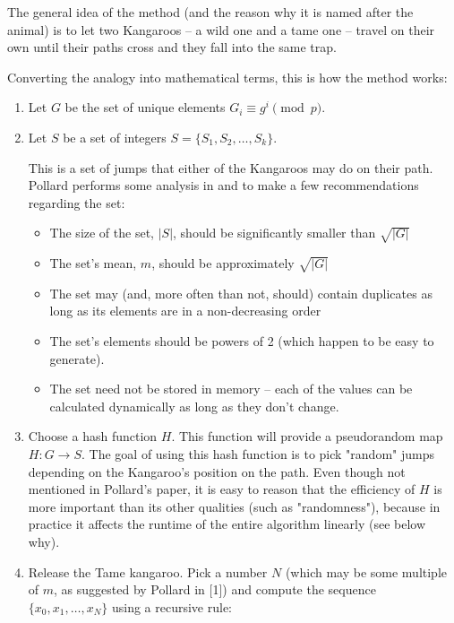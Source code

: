 \documentclass{article}
\begin{document}
        The general idea of the method (and the reason why it is named after the animal) is to let two Kangaroos -- a wild one and a tame one -- travel on their own until their paths cross and they fall into the same trap.

        Converting the analogy into mathematical terms, this is how the method works:

        \begin{enumerate}
          \item Let $G$ be the set of unique elements $G_i \equiv g^i \pmod{p}$.

          \item Let $S$ be a set of integers $S = \{S_1, S_2, \ldots, S_k\}$.

            This is a set of jumps that either of the Kangaroos may do on their path. Pollard performs some analysis in \autocite{Pollard1978} and \autocite{Pollard2000} to make a few recommendations regarding the set:

            \begin{itemize}
              \item The size of the set, $|S|$, should be significantly smaller than $\sqrt{|G|}$
              \item The set's mean, $m$, should be approximately $\sqrt{|G|}$
              \item The set may (and, more often than not, should) contain duplicates as long as its elements are in a non-decreasing order
              \item The set's elements should be powers of 2 (which happen to be easy to generate).
              \item The set need not be stored in memory -- each of the values can be calculated dynamically as long as they don't change.
            \end{itemize}

          \item Choose a hash function $H$. This function will provide a pseudorandom map $H : G \to S$.
            The goal of using this hash function is to pick "random" jumps depending on the Kangaroo's position on the path. Even though not mentioned in Pollard's paper, it is easy to reason that the efficiency of $H$ is more important than its other qualities (such as "randomness"), because in practice it affects the runtime of the entire algorithm linearly (see below why).

          \item Release the Tame kangaroo. Pick a number $N$ (which may be some multiple of $m$, as suggested by Pollard in [1]) and compute the sequence $\{x_0, x_1, \ldots, x_N\}$ using a recursive rule:


\end{enumerate}
\end{document}
